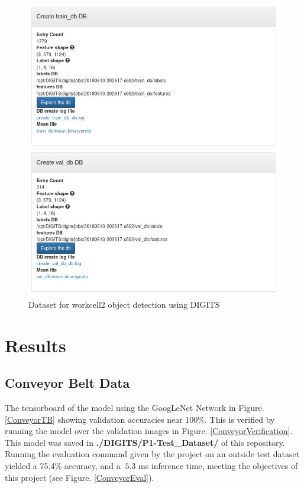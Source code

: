 \documentclass[10pt,journal,compsoc]{IEEEtran}
\begin{document}
\begin{figure}[thpb]
  \centering
  \includegraphics[width=\linewidth]{../img/Workcell2-Object-Detection/dataset/Workcell2-detectNet-Dataset3.png}
  \caption{Dataset for workcell2 object detection using DIGITS}
  \label{labelboxData}
\end{figure}

\section{Results}
\label{sec:results}

\subsection{Conveyor Belt Data}
The tensorboard of the model using the GoogLeNet Network in Figure. \ref{ConveyorTB} showing validation accuracies near 100\%. This is verified by running the model over the validation images in Figure. \ref{ConveyorVerification}. This model was saved in \textbf{ ./DIGITS/P1-Test\_Dataset/} of this repository. Running the evaluation command given by the project on an outside test dataset yielded a 75.4\% accuracy, and a $~5.3$ ms inference time, meeting the objectives of this project (see Figure. \ref{ConveyorEval}).
\end{document}
